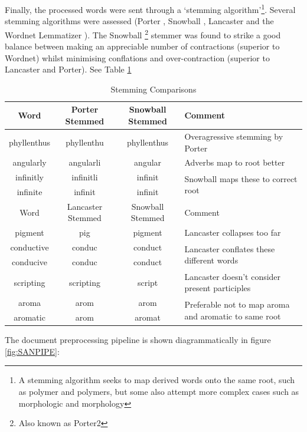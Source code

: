 Finally, the processed words were sent through a `stemming algorithm'\footnote{A stemming algorithm seeks to map derived words onto the same root, such as polymer and polymers, but some also attempt more complex cases such as morphologic and morphology}. Several stemming algorithms were assessed (Porter \cite{porter}, Snowball \cite{snowball}\cite{nltk}, Lancaster \cite{lancaster} and the Wordnet Lemmatizer \cite{wordnet1}\cite{wordnet2}\cite{wordnet3}). The Snowball \footnote{Also known as Porter2} stemmer was found to strike a good balance between making an appreciable number of contractions (superior to Wordnet) whilst minimising conflations and over-contraction (superior to Lancaster and Porter). See Table \ref{tab:stems}
\begin{table}[H]
\begin{center}
\caption{Stemming Comparisons}
\label{tab:stems}
\begin{tabular}{||c|c|c|p{5cm}||}
\hline
Word & Porter Stemmed & Snowball Stemmed & Comment\\
\hline     
phyllenthus & phyllenthu & phyllenthus & Overagressive stemming by Porter\\
\hline
angularly & angularli & angular & Adverbs map to root better\\
\hline
infinitly & infinitli & infinit & \multirow{2}{5cm}{Snowball maps these to correct root}\\
\cline{1-3}
infinite & infinit & infinit&\\
\hline
\hline
Word & Lancaster Stemmed & Snowball Stemmed & Comment\\
\hline
pigment & pig & pigment & Lancaster collapses too far\\
\hline
conductive & conduc & conduct & \multirow{2}{5cm}{Lancaster conflates these different words}\\
\cline{1-3}
conducive & conduc & conduct & \\
\hline
scripting & scripting & script & Lancaster doesn't consider present participles\\
\hline
aroma & arom & arom & \multirow{2}{5cm}{Preferable not to map aroma and aromatic to same root}\\
\cline{1-3}
aromatic & arom & aromat & \\
\hline
\end{tabular}
\end{center}
\end{table}

The document preprocessing pipeline is shown diagrammatically in figure \ref{fig:SANPIPE}:

